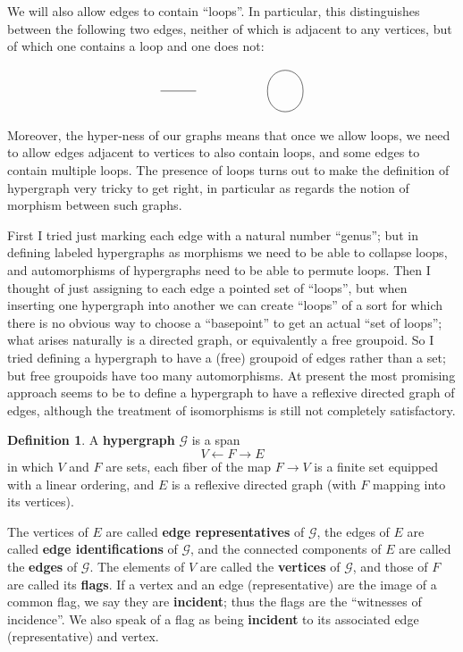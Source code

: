 \documentclass{article}
\theoremstyle{definition}
\newtheorem{defn}[thm]{Definition}
\theoremstyle{remark}
\def\G{\mathcal{G}}
\let\ot\leftarrow
\begin{document}
We will also allow edges to contain ``loops''.
In particular, this distinguishes between the following two edges, neither of which is adjacent to any vertices, but of which one contains a loop and one does not:
\[
\begin{tikzpicture}
  \draw (0,0) -- (1,0);
  \draw (3,0) to[out=90,in=90,looseness=2] (4,0) to[out=-90,in=-90,looseness=2] (3,0);
\end{tikzpicture}
\]
Moreover, the hyper-ness of our graphs means that once we allow loops, we need to allow edges adjacent to vertices to also contain loops, and some edges to contain multiple loops.
The presence of loops turns out to make the definition of hypergraph very tricky to get right, in particular as regards the notion of morphism between such graphs.

First I tried just marking each edge with a natural number ``genus''; but in defining labeled hypergraphs as morphisms we need to be able to collapse loops, and automorphisms of hypergraphs need to be able to permute loops.
Then I thought of just assigning to each edge a pointed set of ``loops'', but when inserting one hypergraph into another we can create ``loops'' of a sort for which there is no obvious way to choose a ``basepoint'' to get an actual ``set of loops''; what arises naturally is a directed graph, or equivalently a free groupoid.
So I tried defining a hypergraph to have a (free) groupoid of edges rather than a set; but free groupoids have too many automorphisms.
At present the most promising approach seems to be to define a hypergraph to have a reflexive directed graph of edges, although the treatment of isomorphisms is still not completely satisfactory.

\begin{defn}
  A \textbf{hypergraph} $\G$ is a span
  \[ V \ot F \to E \]
  in which $V$ and $F$ are sets, each fiber of the map $F\to V$ is a finite set equipped with a linear ordering, and $E$ is a reflexive directed graph (with $F$ mapping into its vertices).

  The vertices of $E$ are called \textbf{edge representatives} of $\G$, the edges of $E$ are called \textbf{edge identifications} of $\G$, and the connected components of $E$ are called the \textbf{edges} of $\G$.
  The elements of $V$ are called the \textbf{vertices} of $\G$, and those of $F$ are called its \textbf{flags}.
  If a vertex and an edge (representative) are the image of a common flag, we say they are \textbf{incident}; thus the flags are the ``witnesses of incidence''.
  We also speak of a flag as being \textbf{incident} to its associated edge (representative) and vertex.
\end{defn}
\end{document}
